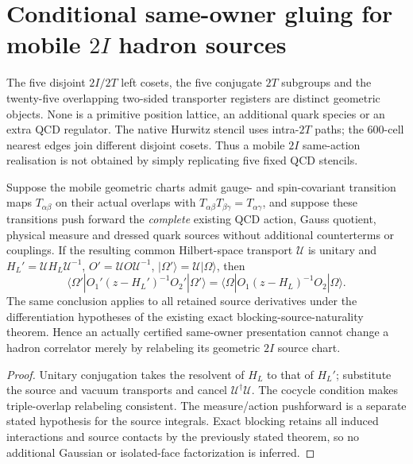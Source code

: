 \documentclass[12pt,a4paper]{article}
\begin{document}
\section{Conditional same-owner gluing for mobile $2I$ hadron sources}
\label{p12:sec:v3023-mobile-2i-apbi-gluing}
The five disjoint $2I/2T$ left cosets, the five conjugate $2T$
subgroups and the twenty-five overlapping two-sided transporter
registers are distinct geometric objects. None is a primitive
position lattice, an additional quark species or an extra QCD
regulator. The native Hurwitz stencil uses intra-$2T$ paths; the
600-cell nearest edges join different disjoint cosets. Thus a
mobile $2I$ same-action realisation is not obtained by simply
replicating five fixed QCD stencils.

\begin{proposition}
\label{p12:prop:v3023-mobile-source-same-owner-gluing}
Suppose the mobile geometric charts admit gauge- and spin-covariant
transition maps $T_{\alpha\beta}$ on their actual overlaps with
$T_{\alpha\beta}T_{\beta\gamma}=T_{\alpha\gamma}$,
and suppose these transitions push forward the \emph{complete}
existing QCD action, Gauss quotient, physical measure and dressed
quark sources without additional counterterms or couplings.
If the resulting common Hilbert-space transport $\mathcal U$ is
unitary and $H_L'=\mathcal U H_L\mathcal U^{-1}$,
$O'=\mathcal U O\mathcal U^{-1}$,
$|\Omega'\rangle=\mathcal U|\Omega\rangle$, then
\[
\boxed{\langle\Omega'|O_1'(z-H_L')^{-1}O_2'|\Omega'\rangle
=\langle\Omega|O_1(z-H_L)^{-1}O_2|\Omega\rangle.}
\]
The same conclusion applies to all retained source derivatives
under the differentiation hypotheses of the existing exact
blocking-source-naturality theorem. Hence an actually certified
same-owner presentation cannot change a hadron correlator merely
by relabeling its geometric $2I$ source chart.
\end{proposition}




\begin{proof}
Unitary conjugation takes the resolvent of $H_L$ to that of
$H_L'$; substitute the source and vacuum transports and cancel
$\mathcal U^\dagger\mathcal U$. The cocycle condition makes
triple-overlap relabeling consistent. The measure/action
pushforward is a separate stated hypothesis for the source
integrals. Exact blocking retains all induced interactions and
source contacts by the previously stated theorem, so no
additional Gaussian or isolated-face factorization is inferred.
\end{proof}
\end{document}
